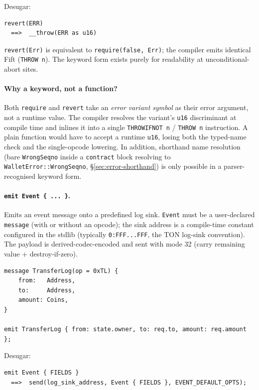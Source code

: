\documentclass[12pt,oneside]{article}
\begin{document}
Desugar:

\begin{verbatim}
revert(ERR)
  ==>  __throw(ERR as u16)
\end{verbatim}

\verb|revert(Err)| is equivalent to \verb|require(false, Err)|; the
compiler emits identical Fift (\verb|THROW n|). The keyword form
exists purely for readability at unconditional-abort sites.

\paragraph{Why a keyword, not a function?}
Both \verb|require| and \verb|revert| take an \emph{error variant
symbol} as their error argument, not a runtime value. The compiler
resolves the variant's \verb|u16| discriminant at compile time and
inlines it into a single \verb|THROWIFNOT n| / \verb|THROW n|
instruction. A plain function would have to accept a runtime
\verb|u16|, losing both the typed-name check and the single-opcode
lowering. In addition, shorthand name resolution (bare
\verb|WrongSeqno| inside a \verb|contract| block resolving to
\verb|WalletError::WrongSeqno|, \S\ref{sec:error-shorthand}) is only
possible in a parser-recognised keyword form.

\paragraph{\texttt{emit Event \{ ... \}}.}
Emits an event message onto a predefined log sink. \verb|Event| must
be a user-declared \verb|message| (with or without an opcode); the
sink address is a compile-time constant configured in the stdlib
(typically \verb|0:FFF...FFF|, the TON log-sink convention). The
payload is derived-codec-encoded and sent with mode 32 (carry remaining
value + destroy-if-zero).

\begin{verbatim}
message TransferLog(op = 0xTL) {
    from:   Address,
    to:     Address,
    amount: Coins,
}

emit TransferLog { from: state.owner, to: req.to, amount: req.amount };
\end{verbatim}

Desugar:

\begin{verbatim}
emit Event { FIELDS }
  ==>  send(log_sink_address, Event { FIELDS }, EVENT_DEFAULT_OPTS);
\end{verbatim}
\end{document}
